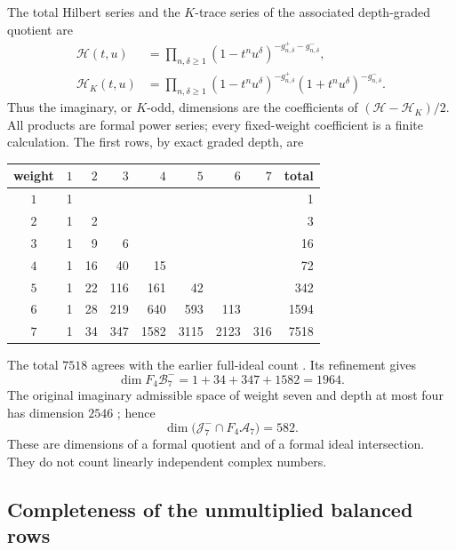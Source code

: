 The total Hilbert series and the $K$-trace series of the associated
depth-graded quotient are
\begin{align}
 \mathscr H(t,u)&=\prod_{n,\delta\ge1}
 (1-t^nu^\delta)^{-g^+_{n,\delta}-g^-_{n,\delta}},
 \label{depthcay:eq:Hilbert}\\
 \mathscr H_K(t,u)&=\prod_{n,\delta\ge1}
 (1-t^nu^\delta)^{-g^+_{n,\delta}}
 (1+t^nu^\delta)^{-g^-_{n,\delta}}.
 \label{depthcay:eq:HilbertK}
\end{align}
Thus the imaginary, or $K$-odd, dimensions are the coefficients of
$(\mathscr H-\mathscr H_K)/2$. All products are formal power series;
every fixed-weight coefficient is a finite calculation.
The first rows, by exact graded depth, are
\begin{center}
\begin{tabular}{c|rrrrrrr|r}
\toprule
weight & $1$ & $2$ & $3$ & $4$ & $5$ & $6$ & $7$ & total\\
\midrule
$1$ &1&&&&&&&1\\
$2$ &1&2&&&&&&3\\
$3$ &1&9&6&&&&&16\\
$4$ &1&16&40&15&&&&72\\
$5$ &1&22&116&161&42&&&342\\
$6$ &1&28&219&640&593&113&&1594\\
$7$ &1&34&347&1582&3115&2123&316&7518\\
\bottomrule
\end{tabular}
\end{center}
The total $7518$ agrees with the earlier full-ideal count
\cite{depth:PriorProjection}. Its refinement gives
\begin{equation}\label{depthcay:eq:weightseven}
 \dim F_4\mathcal B_7^-=1+34+347+1582=1964.
\end{equation}
The original imaginary admissible space of weight seven and depth at
most four has dimension $2546$ \cite{depth:PriorS6}; hence
\begin{equation}\label{depthcay:eq:intersection}
 \dim\bigl(\mathcal J_7^-\cap F_4\mathcal A_7\bigr)=582.
\end{equation}
These are dimensions of a formal quotient and of a formal ideal
intersection. They do not count linearly independent complex numbers.

\subsection{Completeness of the unmultiplied balanced rows}


